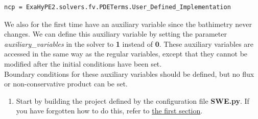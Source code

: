 \documentclass[12pt,letterpaper]{article}
\begin{document}
\begin{lstlisting}[style = Python]
  ncp = ExaHyPE2.solvers.fv.PDETerms.User_Defined_Implementation
\end{lstlisting}

We also for the first time have an auxiliary variable since the bathimetry never changes. We can define this auxiliary variable by setting the parameter \textit{auxiliary\_variables} in the solver to \textbf{1} instead of \textbf{0}. These auxiliary variables are accessed in the same way as the regular variables, except that they cannot be modified after the initial conditions have been set.\\
Boundary conditions for these auxiliary variables should be defined, but no flux or non-conservative product can be set.

\begin{enumerate}
    \item
        Start by building the project defined by the configuration file \textbf{SWE.py}. If you have forgotten how to do this, refer to \hyperref[Verifying_and_building]{the first section}.\\
        

\end{enumerate}
\end{document}
